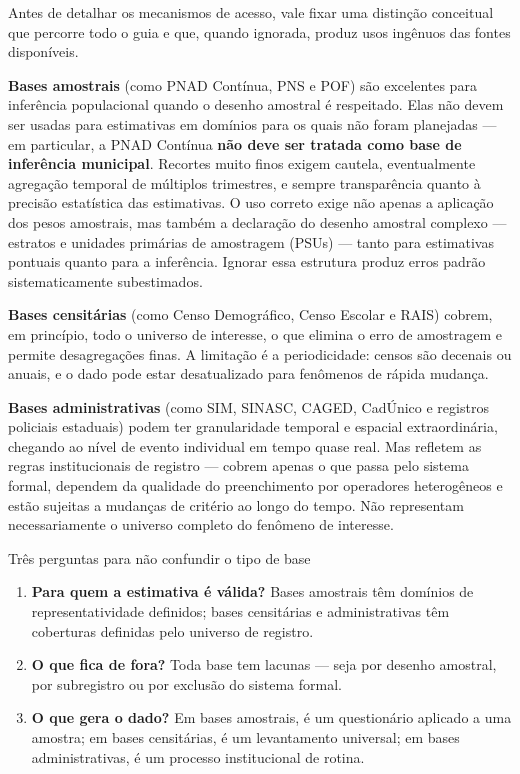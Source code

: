 Antes de detalhar os mecanismos de acesso, vale fixar uma distinção conceitual que percorre todo o guia e que, quando ignorada, produz usos ingênuos das fontes disponíveis.

\textbf{Bases amostrais} (como PNAD Contínua, PNS e POF) são excelentes para inferência populacional quando o desenho amostral é respeitado. Elas não devem ser usadas para estimativas em domínios para os quais não foram planejadas --- em particular, a PNAD Contínua \textbf{não deve ser tratada como base de inferência municipal}. Recortes muito finos exigem cautela, eventualmente agregação temporal de múltiplos trimestres, e sempre transparência quanto à precisão estatística das estimativas. O uso correto exige não apenas a aplicação dos pesos amostrais, mas também a declaração do desenho amostral complexo --- estratos e unidades primárias de amostragem (PSUs) --- tanto para estimativas pontuais quanto para a inferência. Ignorar essa estrutura produz erros padrão sistematicamente subestimados.

\textbf{Bases censitárias} (como Censo Demográfico, Censo Escolar e RAIS) cobrem, em princípio, todo o universo de interesse, o que elimina o erro de amostragem e permite desagregações finas. A limitação é a periodicidade: censos são decenais ou anuais, e o dado pode estar desatualizado para fenômenos de rápida mudança.

\textbf{Bases administrativas} (como SIM, SINASC, CAGED, CadÚnico e registros policiais estaduais) podem ter granularidade temporal e espacial extraordinária, chegando ao nível de evento individual em tempo quase real. Mas refletem as regras institucionais de registro --- cobrem apenas o que passa pelo sistema formal, dependem da qualidade do preenchimento por operadores heterogêneos e estão sujeitas a mudanças de critério ao longo do tempo. Não representam necessariamente o universo completo do fenômeno de interesse.

\begin{boxdestaque}{Três perguntas para não confundir o tipo de base}
\begin{enumerate}
  \item \textbf{Para quem a estimativa é válida?} Bases amostrais têm domínios de representatividade definidos; bases censitárias e administrativas têm coberturas definidas pelo universo de registro.
  \item \textbf{O que fica de fora?} Toda base tem lacunas --- seja por desenho amostral, por subregistro ou por exclusão do sistema formal.
  \item \textbf{O que gera o dado?} Em bases amostrais, é um questionário aplicado a uma amostra; em bases censitárias, é um levantamento universal; em bases administrativas, é um processo institucional de rotina.
\end{enumerate}
\end{boxdestaque}

